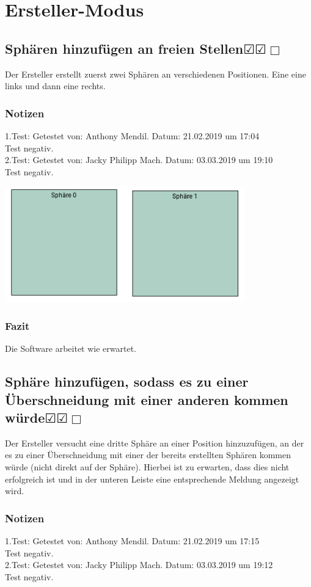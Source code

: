 \documentclass[enabledeprecatedfontcommands]{scrartcl}
\newcommand{\subsectiont}[2]{\subsection[#1]{#1{\normalsize\normalfont #2}}}
\newcommand{\leer}{$\Box$}
\newcommand{\ok}{$\CheckedBox$}
\begin{document}
\section{Ersteller-Modus}

\subsectiont{Sphären hinzufügen an freien Stellen}{\dotfill\ok\ok\leer}
Der Ersteller erstellt zuerst zwei Sphären an verschiedenen Positionen. Eine eine links und dann eine rechts.  
\subsubsection{Notizen}
1.Test: Getestet von: Anthony Mendil. Datum: 21.02.2019 um 17:04 \\
Test negativ. \\
2.Test: Getestet von: Jacky Philipp Mach. Datum: 03.03.2019 um 19:10 \\
Test negativ.
\begin{center}
\includegraphics[height=5cm]{1_1.PNG}
\end{center}
\subsubsection{Fazit}
Die Software arbeitet wie erwartet.

\subsectiont{Sphäre hinzufügen, sodass es zu einer Überschneidung mit einer anderen kommen würde}{\dotfill\ok\ok\leer}
Der Ersteller versucht eine dritte Sphäre an einer Position hinzuzufügen, an der es zu einer Überschneidung mit einer der bereits erstellten Sphären kommen würde (nicht direkt auf der Sphäre). Hierbei ist zu erwarten, dass dies nicht erfolgreich ist und in der unteren Leiste eine entsprechende Meldung angezeigt wird. 
\subsubsection{Notizen}
1.Test: Getestet von: Anthony Mendil. Datum: 21.02.2019 um 17:15 \\
Test negativ. \\
2.Test: Getestet von: Jacky Philipp Mach. Datum: 03.03.2019 um 19:12 \\
Test negativ.
\end{document}
